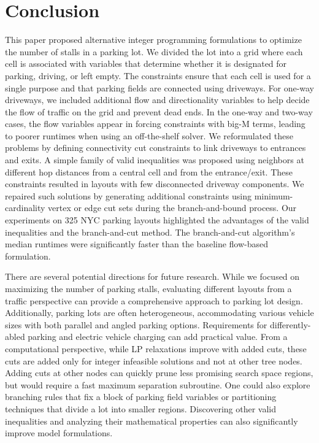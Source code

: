 \documentclass[10pt]{article}
\theoremstyle{definition}
\begin{document}
\section{Conclusion}
\label{sec:conclusion}
This paper proposed alternative integer programming formulations to optimize the number of stalls in a parking lot. We divided the lot into a grid where each cell is associated with variables that determine whether it is designated for parking, driving, or left empty. The constraints ensure that each cell is used for a single purpose and that parking fields are connected using driveways. For one-way driveways, we included additional flow and directionality variables to help decide the flow of traffic on the grid and prevent dead ends. In the one-way and two-way cases, the flow variables appear in forcing constraints with big-M terms, leading to poorer runtimes when using an off-the-shelf solver. We reformulated these problems by defining connectivity cut constraints to link driveways to entrances and exits. A simple family of valid inequalities was proposed using neighbors at different hop distances from a central cell and from the entrance/exit. These constraints resulted in layouts with few disconnected driveway components. We repaired such solutions by generating additional constraints using minimum-cardinality vertex or edge cut sets during the branch-and-bound process. Our experiments on 325 NYC parking layouts highlighted the advantages of the valid inequalities and the branch-and-cut method. The branch-and-cut algorithm's median runtimes were significantly faster than the baseline flow-based formulation. 

There are several potential directions for future research. While we focused on maximizing the number of parking stalls, evaluating different layouts from a traffic perspective can provide a comprehensive approach to parking lot design. Additionally, parking lots are often heterogeneous, accommodating various vehicle sizes with both parallel and angled parking options. Requirements for differently-abled parking and electric vehicle charging can add practical value. From a computational perspective, while LP relaxations improve with added cuts, these cuts are added only for integer infeasible solutions and not at other tree nodes. Adding cuts at other nodes can quickly prune less promising search space regions, but would require a fast maximum separation subroutine. One could also explore branching rules that fix a block of parking field variables or partitioning techniques that divide a lot into smaller regions. Discovering other valid inequalities and analyzing their mathematical properties can also significantly improve model formulations. 
\end{document}
